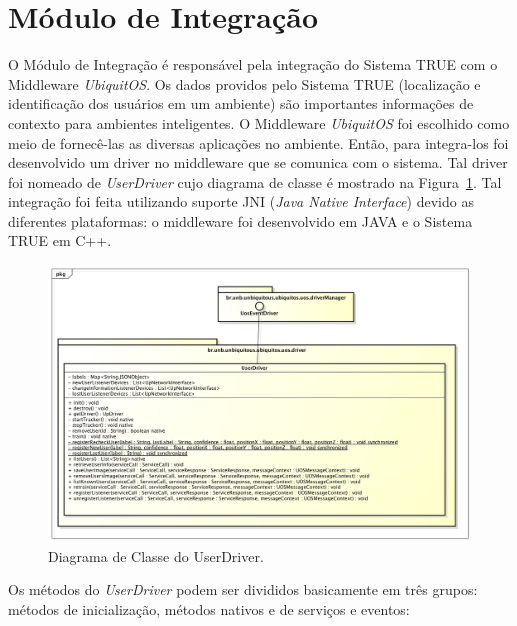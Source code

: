 \section{Módulo de Integração}

O Módulo de Integração é responsável pela integração do Sistema TRUE  com o Middleware \textit{UbiquitOS}. Os dados providos pelo Sistema TRUE (localização e identificação dos usuários em um ambiente) são importantes informações de contexto para ambientes inteligentes. O Middleware \textit{UbiquitOS} foi escolhido como meio de fornecê-las as diversas aplicações no ambiente. Então, para integra-los foi desenvolvido um driver no middleware que se comunica com o sistema. Tal driver foi nomeado de \textit{UserDriver} cujo diagrama de classe é mostrado na Figura~\ref{fig:userdriver}. Tal integração foi feita utilizando suporte JNI (\textit{Java Native Interface}) devido as diferentes plataformas: o middleware foi desenvolvido em JAVA e o Sistema TRUE em C++.

	\begin{figure}[htb]
		\begin{center}
			\includegraphics[scale=0.45]{figuras/4.ProblemaEProposta/diagrama-classe-userdriver.png}
		\end{center}
		\caption{Diagrama de Classe do UserDriver.}
		\label{fig:userdriver}
	\end{figure}

Os métodos do \textit{UserDriver} podem ser divididos basicamente em três grupos: métodos de inicialização, métodos nativos e de serviços e eventos:

